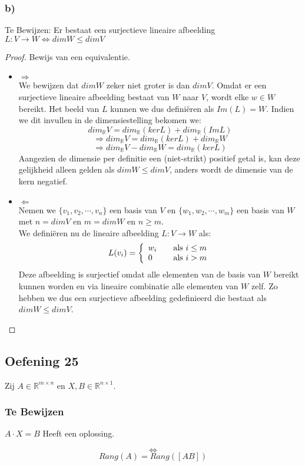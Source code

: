 \documentclass[lineaire_algebra_oplossingen.tex]{subfiles}
\begin{document}
\subsubsection*{b)}
Te Bewijzen:
Er bestaat een surjectieve lineaire afbeelding $L:V\rightarrow W \Leftrightarrow dimW\le dimV$
\begin{proof}
Bewijs van een equivalentie.
\begin{itemize}
\item $\Rightarrow$\\
We bewijzen dat $dimW$ zeker niet groter is dan $dimV$. Omdat er een surjectieve lineaire afbeelding bestaat van $W$ naar $V$, wordt elke $w\in W$ bereikt. Het beeld van $L$ kunnen we dus defini\"eren als $Im(L)=W$. Indien we dit invullen in de dimensiestelling bekomen we:
\[dim_{\mathbb{R}} V = dim_{\mathbb{R}} (kerL) + dim_{\mathbb{R}} (ImL)\]
\[\Rightarrow dim_{\mathbb{R}} V = dim_{\mathbb{R}} (kerL) + dim_{\mathbb{R}} W\]
\[\Rightarrow dim_{\mathbb{R}} V - dim_{\mathbb{R}} W= dim_{\mathbb{R}} (kerL)\]
Aangezien de dimensie per definitie een (niet-strikt) positief getal is, kan deze gelijkheid alleen gelden als $dim W \leq dim V$, anders wordt de dimensie van de kern negatief.
\item $\Leftarrow$\\
Nemen we $\{v_1,v_2,\cdots,v_n\}$ een basis van $V$ en $\{w_1,w_2,\cdots,w_m\}$ een basis van $W$ met $n=dim V$ en $m=dim W$ en $n \geq m$.\\
We defini\"eren nu de lineaire afbeelding $L:V \rightarrow W$ als:
\[ L(v_i) = \left\{
  \begin{array}{l l}
    w_i & \quad \text{als $i \leq m$}\\
    0 & \quad \text{als $i > m$}\\
  \end{array} \right.
\]
Deze afbeelding is surjectief omdat alle elementen van de basis van $W$ bereikt kunnen worden en via lineaire combinatie alle elementen van $W$ zelf. Zo hebben we dus een surjectieve afbeelding gedefinieerd die bestaat als $dim W \leq dim V$.
\end{itemize}
\end{proof}


\subsection{Oefening 25}
Zij $A \in \mathbb{R}^{m\times n}$ en $X,B \in \mathbb{R}^{n\times 1}$.

\subsubsection*{Te Bewijzen}
\begin{center}
$A\cdot X = B$ Heeft een oplossing.
\end{center}
\[\Leftrightarrow\]
\[Rang(A) = Rang([A B])\]
\end{document}
